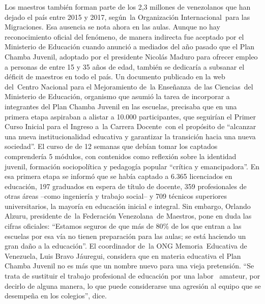 \documentclass{article}%
\begin{document}
\newline%
%
Los maestros también forman parte de los 2,3 millones de venezolanos que han dejado el país entre 2015 y 2017, según~la Organización Internacional~para las Migraciones. Esa ausencia se nota ahora en las aulas. Aunque no hay reconocimiento oficial del fenómeno, de manera indirecta fue aceptado por el Ministerio de Educación cuando anunció a mediados del año pasado que el Plan Chamba Juvenil, adoptado por el presidente Nicolás Maduro para ofrecer empleo a personas de entre 15 y 35 años de edad, también se dedicaría a subsanar el déficit de maestros en todo el país.%
\newline%
%
Un documento publicado en la web del~Centro Nacional para el Mejoramiento de~la Enseñanza~de las Ciencias~del Ministerio de Educación, organismo que asumió la tarea de incorporar a integrantes del Plan Chamba Juvenil en las escuelas, precisaba que en una primera etapa aspiraban a alistar a 10.000 participantes, que seguirían el Primer Curso Inicial para el Ingreso a~la Carrera Docente~con el propósito de “alcanzar una nueva institucionalidad educativa y garantizar la transición hacia una nueva sociedad”.%
\newline%
%
El curso de de 12 semanas que debían tomar los captados comprendería 5 módulos, con contenidos como reflexión sobre la identidad juvenil, formación sociopolítica y pedagogía popular “crítica y emancipadora”.%
\newline%
%
En esa primera etapa se informó que se había captado a 6.365 licenciados en educación, 197 graduados en espera de título de docente, 359 profesionales de otras áreas –como ingeniería y trabajo social– y 709 técnicos superiores universitarios, la mayoría en educación inicial e integral.%
\newline%
%
Sin embargo, Orlando Alzuru, presidente de~la Federación Venezolana~de Maestros, pone en duda las cifras oficiales: “Estamos seguros de que más de 80\% de los que entran a las escuelas por esa vía no tienen preparación para las aulas; se está haciendo un gran daño a la educación”.%
\newline%
%
El coordinador de~la ONG Memoria~Educativa de Venezuela, Luis Bravo Jáuregui, considera que en materia educativa el Plan Chamba Juvenil no es más que un nombre nuevo para una vieja pretensión. “Se trata de sustituir el trabajo profesional de educación por una labor ~amateur, por decirlo de alguna manera, lo que puede considerarse una agresión al equipo que se desempeña en los colegios”, dice.%
\newline%
\end{document}
